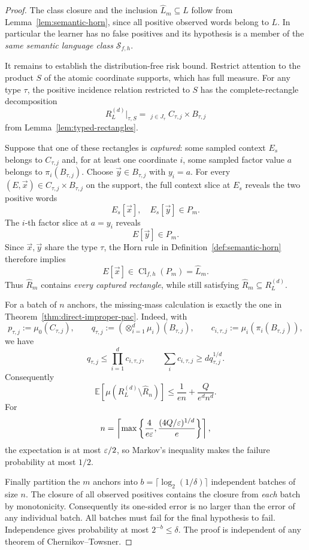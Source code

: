 \begin{proof}
The class closure and the inclusion
\(\widehat L_m\subseteq L\) follow from
Lemma~\ref{lem:semantic-horn}, since all positive observed
words belong to \(L\).  In particular the learner has
no false positives and its hypothesis is a member of the
\emph{same semantic language class} \(\mathcal S_{f,h}\).

It remains to establish the distribution-free risk
bound.  Restrict attention to the product \(S\) of the
atomic coordinate supports, which has full measure.
For any type \(\tau\), the positive incidence relation
restricted to \(S\) has the complete-rectangle decomposition
\[
 R_L^{(d)}|_{\tau,S}
 =\mathop{\dot\bigcup}_{j\in J_\tau}C_{\tau,j}\times
 B_{\tau,j}
\]
from Lemma~\ref{lem:typed-rectangles}.

Suppose that one of these rectangles is \emph{captured}:
some sampled context \(E_s\) belongs to \(C_{\tau,j}\)
and, for at least one coordinate \(i\), some sampled
factor value \(a\) belongs to \(\pi_i(B_{\tau,j})\).
Choose \(\vec y\in B_{\tau,j}\) with \(y_i=a\).
For every \((E,\vec x)\in C_{\tau,j}\times B_{\tau,j}\)
on the support, the full context slice at \(E_s\)
reveals the two positive words
\[
 E_s[\vec x],\quad E_s[\vec y]\in P_m.
\]
The \(i\)-th factor slice at \(a=y_i\) reveals
\[
 E[\vec y]\in P_m.
\]
Since \(\vec x,\vec y\) share the type \(\tau\), the
Horn rule in Definition~\ref{def:semantic-horn}
therefore implies
\[
 E[\vec x]\in\operatorname{Cl}_{f,h}(P_m)
              =\widehat L_m.
\]
Thus \(\widehat R_m\) contains \emph{every captured
rectangle}, while still satisfying
\(\widehat R_m\subseteq R_L^{(d)}\).

For a batch of \(n\) anchors, the missing-mass calculation is
exactly the one in Theorem~\ref{thm:direct-improper-pac}.  Indeed, with
\[
 p_{\tau,j}:=\mu_0(C_{\tau,j}),\qquad
 q_{\tau,j}:=(\otimes_{i=1}^d\mu_i)(B_{\tau,j}),
 \qquad
 c_{i,\tau,j}:=\mu_i(\pi_i(B_{\tau,j})),
\]
we have
\[
 q_{\tau,j}\le\prod_{i=1}^d c_{i,\tau,j},
 \qquad
 \sum_i c_{i,\tau,j}\ge d q_{\tau,j}^{1/d}.
\]
Consequently
\[
 \mathbb E[\mu(R_L^{(d)}\setminus\widehat R_n)]
 \le \frac1{en}+\frac{Q}{e^d n^d}.
\]
For
\[
 n=
 \left\lceil
 \max\left\{
 \frac{4}{e\varepsilon},
 \frac{(4Q/\varepsilon)^{1/d}}{e}
 \right\}
 \right\rceil,
\]
the expectation is at most \(\varepsilon/2\), so Markov's inequality
makes the failure probability at most \(1/2\).

Finally partition the \(m\) anchors into
\(b=\lceil\log_2(1/\delta)\rceil\) independent
batches of size \(n\).
The closure of all observed positives contains
the closure from \emph{each} batch by monotonicity.
Consequently its one-sided error is no larger than
the error of any individual batch.  All batches
must fail for the final hypothesis to fail.
Independence gives probability at most \(2^{-b}\le\delta\).
The proof is independent of any theorem of
Chernikov--Towsner.
\end{proof}

